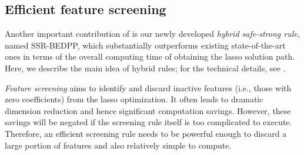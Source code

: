 \subsection{Efficient feature screening}

Another important contribution of  is our newly developed \textit{hybrid safe-strong rule}, named SSR-BEDPP, which substantially outperforms existing state-of-the-art ones in terms of the overall computing time of obtaining the lasso solution path.  Here, we describe the main idea of hybrid rules; for the technical details, see \citet{ZengRules}.

\textit{Feature screening} aims to identify and discard inactive features (i.e., those with zero coefficients) from the lasso optimization. It often leads to dramatic dimension reduction and hence significant computation savings. However, these savings will be negated if the screening rule itself is too complicated to execute. Therefore, an efficient screening rule needs to be powerful enough to discard a large portion of features and also relatively simple to compute.

